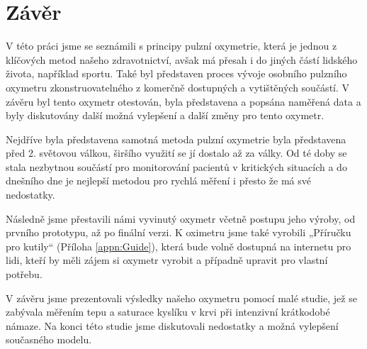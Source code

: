 \newpage
\part{Závěr}
V této práci jsme se seznámili s principy pulzní oxymetrie, která je jednou z klíčových metod našeho zdravotnictví, avšak má přesah i do jiných částí lidského života, například sportu. Také byl představen proces vývoje osobního pulzního oxymetru zkonstruovatelného z komerčně dostupných a vytištěných součástí. V závěru byl tento oxymetr otestován, byla představena a popsána naměřená data a byly diskutovány další možná vylepšení a další změny pro tento oxymetr.
\par Nejdříve byla představena samotná metoda pulzní oxymetrie byla představena před 2. světovou válkou, širšího využití se jí dostalo až za války. Od té doby se stala nezbytnou součástí pro monitorování pacientů v kritických situacích a do dnešního dne je nejlepší metodou pro rychlá měření i přesto že má své nedostatky.
\par Následně jsme přestavili námi vyvinutý oxymetr včetně postupu jeho výroby, od prvního prototypu, až po finální verzi. K oximetru jsme také vyrobili „Příručku pro kutily“ (Příloha \ref{appn:Guide}), která bude volně dostupná na internetu pro lidi, kteří by měli zájem si oxymetr vyrobit a případně upravit pro vlastní potřebu.
\par V závěru jsme prezentovali výsledky našeho oxymetru pomocí malé studie, jež se zabývala měřením tepu a saturace kyslíku v krvi při intenzivní krátkodobé námaze. Na konci této studie jsme diskutovali nedostatky a možná vylepšení současného modelu.